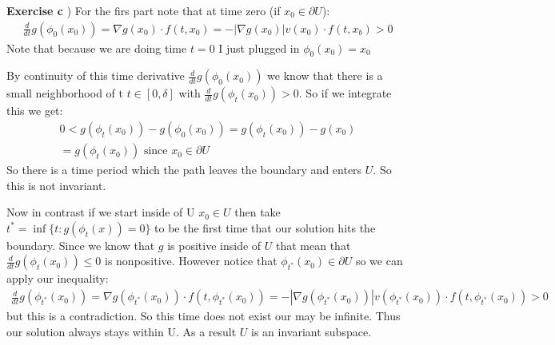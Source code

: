 \documentclass[12pt]{article}
\newenvironment{exercise}[1]{\vspace{.1in}\noindent\textbf{Exercise #1 \hspace{.05em}}}{}
\theoremstyle{definition}
\theoremstyle{remark}
\begin{document}
\begin{exercise}{3.1}
	c) For the firs part note that at time zero (if $x_0\in \partial U$):
	\begin{align}
		\frac{d}{dt}g(\phi_0(x_0))=\nabla g(x_0)\cdot f(t,x_0)=-|\nabla g(x_0)|v(x_0)\cdot f(t,x_b)>0
	\end{align}
	Note that because we are doing time $t=0$ I just plugged in $\phi_0(x_0)=x_0$

	By continuity of this time derivative $\frac{d}{dt}g(\phi_0(x_0))$ we know that there is a small neighborhood of t $t\in [0,\delta]$ with $\frac{d}{dt}g(\phi_t(x_0))>0$. So if we integrate this  we get:
	\begin{align}
		0<g(\phi_t(x_0))-g(\phi_0(x_0))= g(\phi_t(x_0))-g(x_0) \\
		=g(\phi_t(x_0))\text{ since }x_0\in \partial U
	\end{align}
	So there is a time period which the path leaves the boundary and enters $U$. So this is not invariant.

	Now in contrast if we start inside of U $x_0\in U$ then take $t^*=\inf\{t:g(\phi_t(x))=0\}$ to be the first time that our solution hits the boundary. Since we know that $g$ is positive inside of $U$ that mean that $\frac{d}{dt}g(\phi_t(x_0))\leq 0$ is nonpositive. However notice that $\phi_{t^*}(x_0)\in \partial U$ so we can apply our inequality:
	\begin{align}
		\frac{d}{dt}g(\phi_{t^*}(x_0))=\nabla g(\phi_{t^*}(x_0))\cdot f(t,\phi_{t^*}(x_0))=-|\nabla g(\phi_{t^*}(x_0))|v(\phi_{t^*}(x_0))\cdot f(t,\phi_{t^*}(x_0))>0
	\end{align}
	but this is a contradiction. So this time does not exist our may be infinite. Thus our solution always stays within U. As a result $U$ is an invariant subspace.
\end{exercise}
\end{document}
